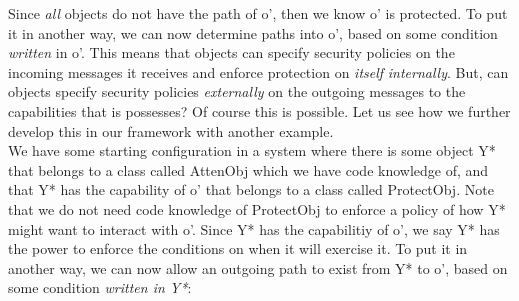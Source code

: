 \documentclass[a4paper,11pt, twoside,twocolumn]{article}
\begin{document}
Since \textit{all} objects do not have the path of o', then we know o' is protected. To put it in another way, we can now determine paths into o',  based on some condition \textit{written} in o'. This means that objects can specify security policies on the incoming messages it receives and enforce protection on \textit{itself} \textit{internally}. But, can objects specify security policies \textit{externally} on the outgoing messages to the capabilities that is possesses? Of course this is possible. Let us see how we further develop this in our framework with another example.\\


We have some starting configuration in a system where there is some object Y* that belongs to a class called AttenObj which we have code knowledge of, and that Y* has the capability of o' that belongs to a class called ProtectObj. Note that we do not need code knowledge of ProtectObj to enforce a policy of how Y* might want to interact with o'. Since Y* has the capabilitiy of o', we say Y* has the power to enforce the conditions on when it will exercise it. To put it in another way, we can now allow an outgoing path to exist from Y* to o', based on some condition \textit{written in Y*}:
\end{document}
